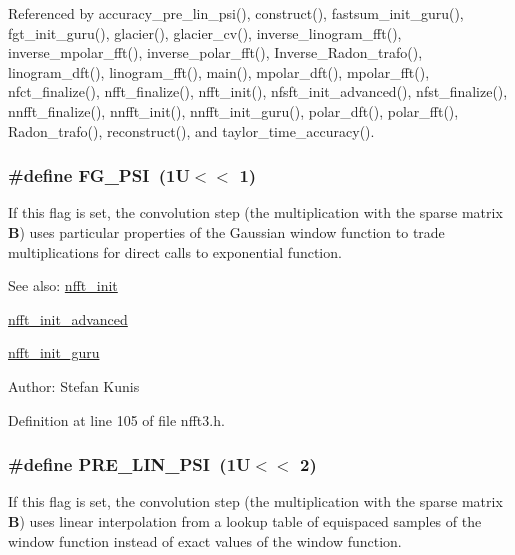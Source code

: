 Referenced by accuracy\_\-pre\_\-lin\_\-psi(), construct(), fastsum\_\-init\_\-guru(), fgt\_\-init\_\-guru(), glacier(), glacier\_\-cv(), inverse\_\-linogram\_\-fft(), inverse\_\-mpolar\_\-fft(), inverse\_\-polar\_\-fft(), Inverse\_\-Radon\_\-trafo(), linogram\_\-dft(), linogram\_\-fft(), main(), mpolar\_\-dft(), mpolar\_\-fft(), nfct\_\-finalize(), nfft\_\-finalize(), nfft\_\-init(), nfsft\_\-init\_\-advanced(), nfst\_\-finalize(), nnfft\_\-finalize(), nnfft\_\-init(), nnfft\_\-init\_\-guru(), polar\_\-dft(), polar\_\-fft(), Radon\_\-trafo(), reconstruct(), and taylor\_\-time\_\-accuracy().\hypertarget{group__nfft_ga17}{
\subsubsection[FG\_\-PSI]{\setlength{\rightskip}{0pt plus 5cm}\#define FG\_\-PSI~(1U$<$$<$ 1)}}
\label{group__nfft_ga17}


If this flag is set, the convolution step (the multiplication with the sparse matrix $\mathbf{B}$) uses particular properties of the Gaussian window function to trade multiplications for direct calls to exponential function. 

\begin{Desc}
\item[See also:]\hyperlink{group__nfft_ga7}{nfft\_\-init} 

\hyperlink{group__nfft_ga8}{nfft\_\-init\_\-advanced} 

\hyperlink{group__nfft_ga9}{nfft\_\-init\_\-guru} \end{Desc}
\begin{Desc}
\item[Author:]Stefan Kunis \end{Desc}


Definition at line 105 of file nfft3.h.\hypertarget{group__nfft_ga18}{
\subsubsection[PRE\_\-LIN\_\-PSI]{\setlength{\rightskip}{0pt plus 5cm}\#define PRE\_\-LIN\_\-PSI~(1U$<$$<$ 2)}}
\label{group__nfft_ga18}


If this flag is set, the convolution step (the multiplication with the sparse matrix $\mathbf{B}$) uses linear interpolation from a lookup table of equispaced samples of the window function instead of exact values of the window function. 

